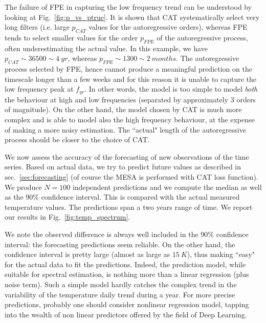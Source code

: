 \documentclass{aa}
\begin{document}
The failure of FPE in capturing the low frequency trend can be understood by looking at Fig.~\ref{fig:p_vs_ptrue}. It is shown that CAT systematically select very long filters (i.e. large $p_{CAT}$ values for the autoregressive orders), whereas FPE tends to select smaller values for the order $p_{FPE}$ of the autoregressive process, often underestimating the actual value.
In this example, we have $p_{CAT} \sim  36500 \sim  \SI{4}{yr}$, whereas $p_{FPE} \sim  1300 \sim  \SI{2}{months}$.
The autoregressive process selected by FPE, hence cannot produce a meaningful prediction on the timescale longer than a few weeks and for this reason it is unable to capture the low frequency peak at $f_{yr}$. In other words, the model is too simple to model \textit{both} the behaviour at high and low frequencies (separated by approximately 3 orders of magnitude).
On the other hand, the model chosen by CAT is much more complex and is able to model also the high frequency behaviour, at the expense of making a more noisy estimation.
The ``actual" length of the autoregressive process should be closer to the choice of CAT.

We now assess the accuracy of the forecasting of new observations of the time series. 
Based on actual data, we try to predict future values as described in sec.~\ref{sec:forecasting} (of course the MESA is performed with CAT loss function). We produce $N =100$ independent predictions and we compute the median as well as the $90\%$ confidence interval. This is compared with the actual measured temperature values. The predictions span a two years range of time. We report our results in Fig.~\ref{fig:temp_spectrum}.

We note the observed difference is always well included in the $90\%$ confidence interval: the forecasting predictions seem reliable.
On the other hand, the confidence interval is pretty large (almost as large as $\SI{15}{K}$), thus making ``easy" for the actual data to fit the predictions.
Indeed, the prediction model, while suitable for spectral estimation, is nothing more than a linear regression (plus noise term). Such a simple model hardly catches the complex trend in the variability of the temperature daily trend during a year. For more precise predictions, probably one should consider nonlinear regression model, tapping into the wealth of non linear predictors offered by the field of Deep Learning.
\end{document}
